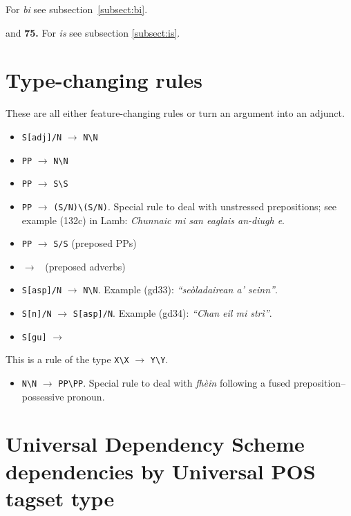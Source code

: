 \documentclass[a4paper]{article}
\begin{document}
 For \textit{bi} see subsection~\ref{subsect:bi}.

 and {\bf 75.} For \textit{is} see subsection \ref{subsect:is}.


\section{Type-changing rules\label{section:typechanging}}

These are all either feature-changing rules or turn an argument into an adjunct.

\begin{itemize}
\item \texttt{S[adj]/N} $\rightarrow$ \texttt{N\textbackslash N}
\item \texttt{PP} $\rightarrow$ \texttt{N\textbackslash N}
\item \texttt{PP} $\rightarrow$ \texttt{S\textbackslash S}
\item \texttt{PP} $\rightarrow$ \texttt{(S/N)\textbackslash(S/N)}.
Special rule to deal with unstressed prepositions; see example (132c) in Lamb: \textit{Chunnaic mi san eaglais an-diugh e}.
\item \texttt{PP} $\rightarrow$ \texttt{S/S} (preposed PPs)
\item \SbNsSbN $\rightarrow$ \SsS\ (preposed adverbs)
\item \texttt{S[asp]/N} $\rightarrow$ \texttt{N\textbackslash N}.
Example (gd33): \textit{``se\`oladairean a' seinn''}.
\item \texttt{S[n]/N} $\rightarrow$ \texttt{S[asp]/N}.
Example (gd34): \textit{``Chan eil mi str\`i''}.
\item \texttt{S[gu]} $\rightarrow$ \NbN
\end{itemize}

This is a rule of the type \texttt{X\textbackslash X} $\rightarrow$ \texttt{Y\textbackslash Y}.

\begin{itemize}
\item \texttt{N\textbackslash N} $\rightarrow$ \texttt{PP\textbackslash PP}.
Special rule to deal with \textit{fh\`ein} following a fused preposition--possessive pronoun.
\end{itemize}







\section{Universal Dependency Scheme dependencies by Universal POS tagset type}
\end{document}
